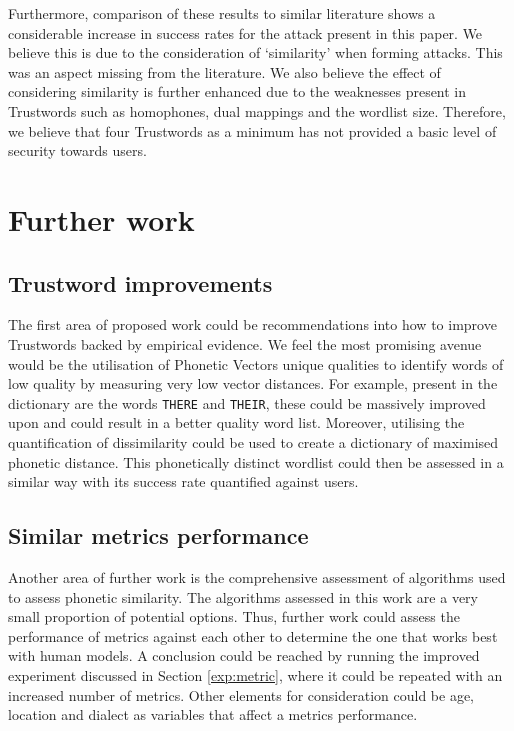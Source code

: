 Furthermore, comparison of these results to similar literature shows a considerable increase in success rates for the attack present in this paper. We believe this is due to the consideration of `similarity' when forming attacks. This was an aspect missing from the literature.
We also believe the effect of considering similarity is further enhanced due to the  weaknesses present in Trustwords such as homophones, dual mappings and the wordlist size. Therefore, we believe that four Trustwords as a minimum has not provided a basic level of security towards users.

\section{Further work}

\subsection*{Trustword improvements}
The first area of proposed work could be recommendations into how to improve Trustwords backed by empirical evidence. We feel the most promising avenue would be the utilisation of Phonetic Vectors unique qualities to identify words of low quality by measuring very low vector distances. For example, present in the dictionary are the words \verb|THERE| and \verb|THEIR|, these could be massively improved upon and could result in a better quality word list. Moreover, utilising the quantification of dissimilarity could be used to create a dictionary of maximised phonetic distance. This phonetically distinct wordlist could then be assessed in a similar way with its success rate quantified against users.

\subsection*{Similar metrics performance}
Another area of further work is the comprehensive assessment of algorithms used to assess phonetic similarity. The algorithms assessed in this work are a very small proportion of potential options. Thus, further work could assess the performance of metrics against each other to determine the one that works best with human models. A conclusion could be reached by running the improved experiment discussed in Section \ref{exp:metric}, where it could be repeated with an increased number of metrics. Other elements for consideration could be age, location and dialect as variables that affect a metrics performance. 

